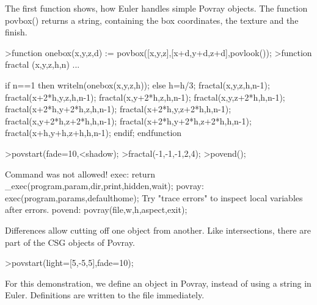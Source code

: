 \documentclass[a4paper,10pt]{article}
\begin{document}
\begin{eulernotebook}
\begin{eulercomment}
The first function shows, how Euler handles simple Povray objects. The
function povbox() returns a string, containing the box coordinates,
the texture and the finish.
\end{eulercomment}
\begin{eulerprompt}
>function onebox(x,y,z,d) := povbox([x,y,z],[x+d,y+d,z+d],povlook());
>function fractal (x,y,z,h,n) ...
\end{eulerprompt}
\begin{eulerudf}
   if n==1 then writeln(onebox(x,y,z,h));
   else
     h=h/3;
     fractal(x,y,z,h,n-1);
     fractal(x+2*h,y,z,h,n-1);
     fractal(x,y+2*h,z,h,n-1);
     fractal(x,y,z+2*h,h,n-1);
     fractal(x+2*h,y+2*h,z,h,n-1);
     fractal(x+2*h,y,z+2*h,h,n-1);
     fractal(x,y+2*h,z+2*h,h,n-1);
     fractal(x+2*h,y+2*h,z+2*h,h,n-1);
     fractal(x+h,y+h,z+h,h,n-1);
   endif;
  endfunction
\end{eulerudf}
\begin{eulerprompt}
>povstart(fade=10,<shadow);
>fractal(-1,-1,-1,2,4);
>povend();
\end{eulerprompt}
\begin{euleroutput}
  Command was not allowed!
  exec:
      return _exec(program,param,dir,print,hidden,wait);
  povray:
      exec(program,params,defaulthome);
  Try "trace errors" to inspect local variables after errors.
  povend:
      povray(file,w,h,aspect,exit); 
\end{euleroutput}
\begin{eulercomment}
Differences allow cutting off one object from another. Like
intersections, there are part of the CSG objects of Povray.
\end{eulercomment}
\begin{eulerprompt}
>povstart(light=[5,-5,5],fade=10);
\end{eulerprompt}
\begin{eulercomment}
For this demonstration, we define an object in Povray, instead of
using a string in Euler. Definitions are written to the file
immediately.


\end{eulercomment}
\end{eulernotebook}
\end{document}
